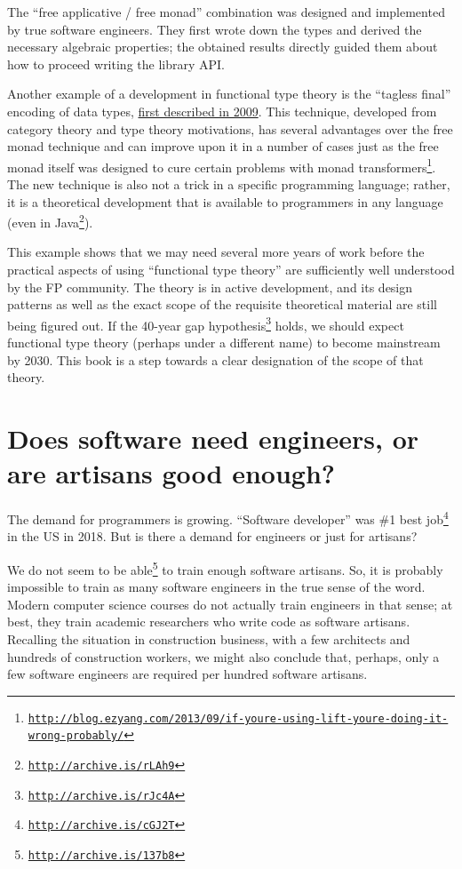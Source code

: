 The ``free applicative / free monad'' combination was designed and
implemented by true software engineers. They first wrote down the
types and derived the necessary algebraic properties; the obtained
results directly guided them about how to proceed writing the library
API.

Another example of a development in functional type theory is the
 ``tagless final'' encoding of data types, \href{http://okmij.org/ftp/tagless-final/index.html}{first described in 2009}.
This technique, developed from category theory and type theory motivations,
has several advantages over the free monad technique and can improve
upon it in a number of cases \textendash{} just as the free monad
itself was designed to cure certain problems with monad transformers\footnote{\texttt{\href{http://blog.ezyang.com/2013/09/if-youre-using-lift-youre-doing-it-wrong-probably/}{http://blog.ezyang.com/2013/09/if-youre-using-lift-youre-doing-it-wrong-probably/}}}.
The new technique is also not a trick in a specific programming language;
rather, it is a theoretical development that is available to programmers
in any language (even in Java\footnote{\texttt{\href{http://archive.is/rLAh9}{http://archive.is/rLAh9}}}).

This example shows that we may need several more years of work before
the practical aspects of using ``functional type theory'' are sufficiently
well understood by the FP community. The theory is in active development,
and its design patterns \textendash{} as well as the exact scope of
the requisite theoretical material \textendash{} are still being figured
out. If the 40-year gap hypothesis\footnote{\texttt{\href{http://archive.is/rJc4A}{http://archive.is/rJc4A}}}
holds, we should expect functional type theory (perhaps under a different
name) to become mainstream by 2030. This book is a step towards a
clear designation of the scope of that theory.

\section{Does software need engineers, or are artisans good enough? }

The demand for programmers is growing. ``Software developer'' was
\#1 best job\footnote{\texttt{\href{http://archive.is/cGJ2T}{http://archive.is/cGJ2T}}}
in the US in 2018. But is there a demand for engineers or just for
artisans?

We do not seem to be able\footnote{\texttt{\href{http://archive.is/137b8}{http://archive.is/137b8}}}
to train enough software artisans. So, it is probably impossible to
train as many software engineers in the true sense of the word. Modern
computer science courses do not actually train engineers in that sense;
at best, they train academic researchers who write code as software
artisans. Recalling the situation in construction business, with a
few architects and hundreds of construction workers, we might also
conclude that, perhaps, only a few software engineers are required
per hundred software artisans.

